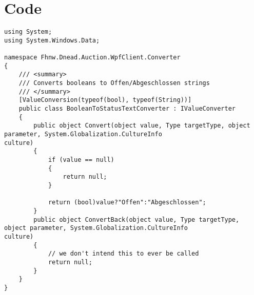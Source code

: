 \documentclass[a4paper,10pt]{scrreprt}
\begin{document}
\chapter{Code}

\begin{lstlisting}[caption=Converter WPF]
using System;
using System.Windows.Data;

namespace Fhnw.Dnead.Auction.WpfClient.Converter
{
    /// <summary>
    /// Converts booleans to Offen/Abgeschlossen strings
    /// </summary>
    [ValueConversion(typeof(bool), typeof(String))]
    public class BooleanToStatusTextConverter : IValueConverter
    {
        public object Convert(object value, Type targetType, object parameter, System.Globalization.CultureInfo 
culture)
        {
            if (value == null)
            {
                return null;
            }

            return (bool)value?"Offen":"Abgeschlossen";
        }
        public object ConvertBack(object value, Type targetType, object parameter, System.Globalization.CultureInfo 
culture)
        {
            // we don't intend this to ever be called
            return null;
        }
    }
}
\end{lstlisting}
\end{document}
